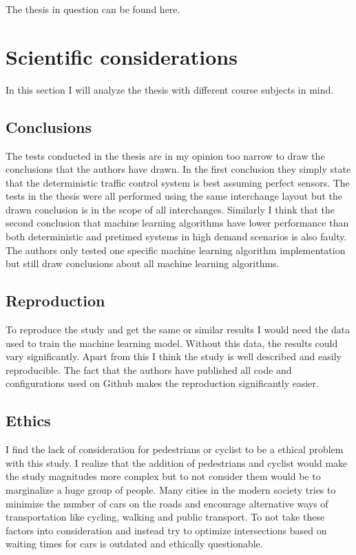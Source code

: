 \documentclass[10pt, a4paper]{article}
\begin{document}
The thesis in question can be found here\cite{thesis}.

\section{Scientific considerations}
In this section I will analyze the thesis with different course subjects in mind.

\subsection{Conclusions}
The tests conducted in the thesis are in my opinion too narrow to draw the conclusions that the authors have drawn. In the first conclusion
they simply state that the deterministic traffic control system is best assuming perfect sensors.
The tests in the thesis were all performed using the same interchange layout but the drawn conclusion is in the scope of all interchanges.
Similarly I think that the second conclusion that machine learning algorithms have lower performance than both deterministic and pretimed
systems in high demand scenarios is also faulty. The authors only tested one specific machine learning algorithm implementation but still
draw conclusions about all machine learning algorithms.

\subsection{Reproduction}
To reproduce the study and get the same or similar results I would need the data used to train the machine learning model.
Without this data, the results could vary significantly. Apart from this I think the study is well described and easily reproducible.
The fact that the authors have published all code and configurations used on Github makes the reproduction significantly easier.

\subsection{Ethics}
I find the lack of consideration for pedestrians or cyclist to be a ethical problem with this study. I realize that the addition of pedestrians
and cyclist would make the study magnitudes more complex but to not consider them would be to marginalize a huge group of people.
Many cities in the modern society tries to minimize the number of cars on the roads and encourage alternative ways of transportation
like cycling, walking and public transport. To not take these factors into consideration and instead try to optimize intersections based on
waiting times for cars is outdated and ethically questionable.
\end{document}
